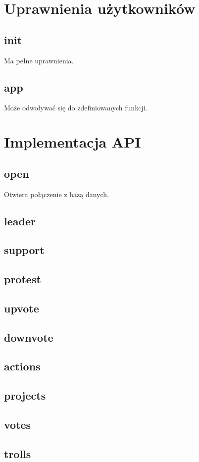 \documentclass[polish,11pt,a4paper]{article}
\begin{document}
\section{Uprawnienia użytkowników}
    \subsection{init}
        Ma pełne uprawnienia.
    \subsection{app}
        Może odwoływać się do zdefiniowanych funkcji.

\section{Implementacja API}
    \subsection{open}
        Otwiera połączenie z bazą danych.
    \subsection{leader}
        
    \subsection{support}
    \subsection{protest}
    \subsection{upvote}
    \subsection{downvote}
    \subsection{actions}
    \subsection{projects}
    \subsection{votes}
    \subsection{trolls}
    
\end{document}
